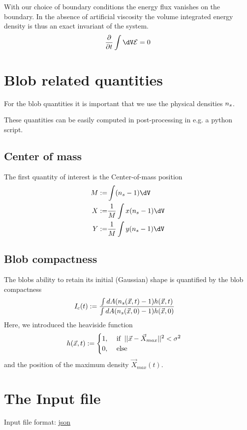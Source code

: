 With our choice of boundary conditions the energy flux
vanishes on the boundary.
In the absence of artificial viscosity the volume integrated
 energy density is thus an exact invariant of the system.
\begin{align}
    \frac{\partial}{\partial t} \int \dV \mathcal E = 0
\end{align}
\section{Blob related quantities}
For the blob quantities it is important that we use the physical densities ${n_s} $.
\begin{tcolorbox}[title=Note]
    These quantities can be easily computed in post-processing in e.g. a python script.
\end{tcolorbox}

\subsection{Center of mass}
The first quantity of interest is the Center-of-mass position
\begin{align}
    M :=& \int (\physs -1 ) \dV \\
    X :=& \frac{1}{M} \int x(\physs - 1) \dV \\
    Y :=& \frac{1}{M} \int y(\physs - 1) \dV
\end{align}
\subsection{Blob compactness}
The blobs ability to retain its initial (Gaussian) shape is quantified by the  blob compactness
\begin{align}
     I_c(t) &:= \frac{\int dA ({n_s} (\vec{x},t)-1) h(\vec{x},t)}{\int dA
({n_s} (\vec{x},0)-1) h(\vec{x},0)}
\end{align}
Here, we introduced the heaviside function
\begin{align}
     h(\vec{x},t) &:= \begin{cases}
          1,
        &\ \text{if} \hspace{2mm}||\vec{x} - \vec{X}_{max}||^2 < \sigma^2 \\
0,  &\ \text{else}
           \end{cases} \nonumber
\end{align}
and the position of the maximum density \( \vec{X}_{max}(t)\).


\section{The Input file} \label{sec:input_file}
Input file format: \href{https://en.wikipedia.org/wiki/JSON}{json}
